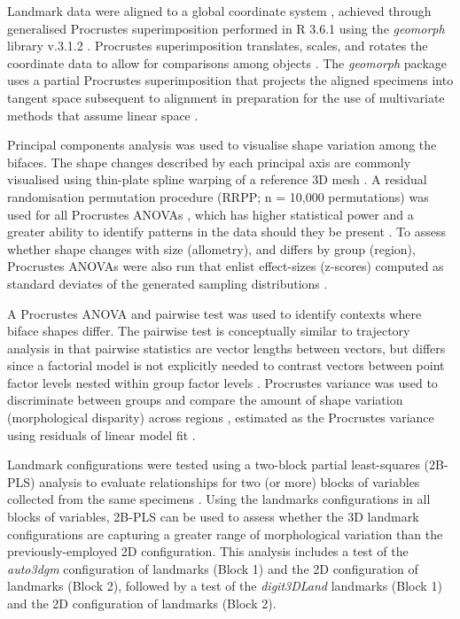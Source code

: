 \documentclass[review]{elsarticle}
\begin{document}
Landmark data were aligned to a global coordinate system \citep{RN11622,RN11623,RN11563}, achieved through generalised Procrustes superimposition \citep{RN478} performed in R 3.6.1 \citep{R} using the \textit{geomorph} library v.3.1.2 \citep{RN11530,RN1774}. Procrustes superimposition translates, scales, and rotates the coordinate data to allow for comparisons among objects \citep{RN11564,RN478}. The \textit{geomorph} package uses a partial Procrustes superimposition that projects the aligned specimens into tangent space subsequent to alignment in preparation for the use of multivariate methods that assume linear space \citep{RN1646,RN11563}.

Principal components analysis \citep{RN1746} was used to visualise shape variation among the bifaces. The shape changes described by each principal axis are commonly visualised using thin-plate spline warping of a reference 3D mesh \citep{RN1731,RN479}. A residual randomisation permutation procedure (RRPP; n = 10,000 permutations) was used for all Procrustes ANOVAs \citep{RN1655,RN11775}, which has higher statistical power and a greater ability to identify patterns in the data should they be present \citep{RN1719}. To assess whether shape changes with size (allometry), and differs by group (region), Procrustes ANOVAs \citep{RN1749} were also run that enlist effect-sizes (z-scores) computed as standard deviates of the generated sampling distributions \citep{RN1756}. 

A Procrustes ANOVA and pairwise test was used to identify contexts where biface shapes differ. The pairwise test is conceptually similar to trajectory analysis \citep{RN11573,RN1648,RN1776,RN1739} in that pairwise statistics are vector lengths between vectors, but differs since a factorial model is not explicitly needed to contrast vectors between point factor levels nested within group factor levels \citep{RN11530}. Procrustes variance was used to discriminate between groups and compare the amount of shape variation (morphological disparity) across regions \citep{RN11560}, estimated as the Procrustes variance using residuals of linear model fit \citep{RN11530}. 

Landmark configurations were tested using a two-block partial least-squares (2B-PLS) analysis to evaluate relationships for two (or more) blocks of variables collected from the same specimens \citep{RN11615,RN11613,RN11614}. Using the landmarks configurations in all blocks of variables, 2B-PLS can be used to assess whether the 3D landmark configurations are capturing a greater range of morphological variation than the previously-employed 2D configuration. This analysis includes a test of the \textit{auto3dgm} configuration of landmarks (Block 1) and the 2D configuration of landmarks (Block 2), followed by a test of the \textit{digit3DLand} landmarks (Block 1) and the 2D configuration of landmarks (Block 2). 
\end{document}
